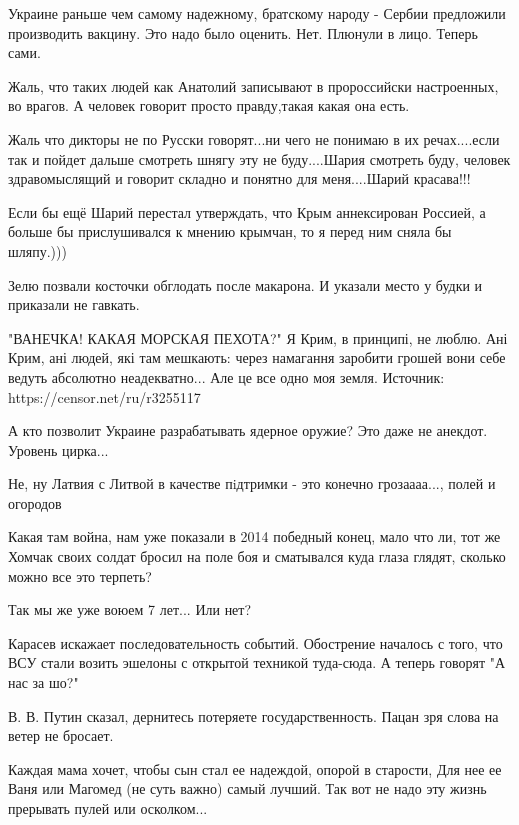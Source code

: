 Украине раньше чем самому надежному, братскому народу - Сербии предложили
производить вакцину. Это надо было оценить. Нет. Плюнули в лицо. Теперь сами.

Жаль, что таких людей как Анатолий записывают в пророссийски настроенных, во
врагов. А человек говорит просто правду,такая какая она есть.

Жаль что дикторы не по Русски говорят...ни чего не понимаю в их речах....если
так и пойдет дальше смотреть шнягу эту не буду....Шария смотреть буду, человек
здравомыслящий и говорит складно и понятно для меня....Шарий красава!!!

Если бы ещё Шарий перестал утверждать, что Крым аннексирован Россией, а больше
бы прислушивался к мнению крымчан, то я  перед ним сняла бы шляпу.)))

Зелю позвали косточки обглодать после макарона. И указали место у будки и приказали не гавкать.


"ВАНЕЧКА! КАКАЯ МОРСКАЯ ПЕХОТА?"
Я Крим, в принципі, не люблю. Ані Крим, ані людей, які там мешкають: через намагання заробити грошей вони себе ведуть абсолютно неадекватно... Але це все одно моя земля. Источник: https://censor.net/ru/r3255117


А кто позволит Украине разрабатывать ядерное оружие? Это даже не анекдот. Уровень цирка...

Не, ну Латвия с Литвой в качестве пiдтримки - это конечно грозаааа..., полей и огородов 

Какая там война, нам уже показали в 2014 победный конец, мало что ли, тот же
Хомчак своих солдат бросил на поле боя и сматывался куда глаза глядят, сколько
можно все это терпеть?

Так мы же уже воюем 7 лет... Или нет?

Карасев искажает последовательность событий. Обострение началось с того, что
ВСУ стали возить эшелоны с открытой техникой туда-сюда. А теперь говорят "А нас
за шо?"

В. В. Путин сказал, дернитесь потеряете государственность.  Пацан  зря слова на
ветер не бросает.

Каждая мама хочет, чтобы сын стал ее надеждой, опорой в старости,  Для нее ее
Ваня или Магомед (не суть важно) самый лучший. Так вот не надо эту жизнь
прерывать пулей или осколком...

